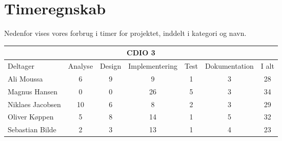 \chapter*{Timeregnskab}

Nedenfor vises vores forbrug i timer for projektet, inddelt i kategori og navn.

\begin{table}[h]
    \centering
        \begin{tabular}{|l|c|c|c|c|c|c|}
                \hline
            \multicolumn{7}{|c|}{CDIO 3}
            \\ \hline
                    Deltager         &  Analyse  &  Design  &  Implementering  &  Test  &  Dokumentation  &  I alt
            \\ \hline
                    Ali Moussa       &    6      &    9     &        9         &    1   &        3        &    28
            \\ \hline
                    Magnus Hansen    &    0      &    0     &        26         &    5   &        3        &    34
            \\ \hline
                    Niklaes Jacobsen &    10      &    6     &        8         &    2   &        3        &    29
            \\ \hline
                    Oliver Køppen    &    5      &    8     &        14        &    1   &        5        &    32
            \\ \hline
                    Sebastian Bilde  &    2      &    3     &        13         &    1   &        4        &   23
            \\ \hline
        \end{tabular}
\end{table}
